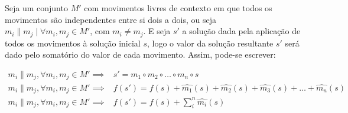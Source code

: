 % 
\begin{theorem}\label{teo:independenciaMovimentos}
Seja um conjunto $M'$ com movimentos livres de contexto em que todos os movimentos são independentes entre si dois a dois, ou seja $m_i \parallel m_j \mid \forall m_i, m_j \in M'$, com $m_i \ne m_j$.
E seja $s'$ a solução dada pela aplicação de todos os movimentos à solução inicial $s$, logo o valor da solução resultante $s'$ será dado pelo somatório do valor de cada movimento. Assim, pode-se escrever:


\begin{equation}
    \label{eq:teo:independenciaMovimentos}
    \begin{split}
        m_i \parallel m_j, \forall m_i, m_j \in M' \implies& s' = m_1 \circ m_2 \circ \dots \circ m_n \circ s \\
        m_i \parallel m_j, \forall m_i, m_j \in M' \implies& f(s') = f(s) + \widehat{m_1}(s) + \widehat{m_2}(s)+ \widehat{m_3}(s) + \dots + \widehat{m_n}(s) \\
        m_i \parallel m_j, \forall m_i, m_j \in M' \implies& f(s') = f(s) + \sum_i^n{\widehat{m_i}(s)}
    \end{split}
\end{equation}
\end{theorem}

